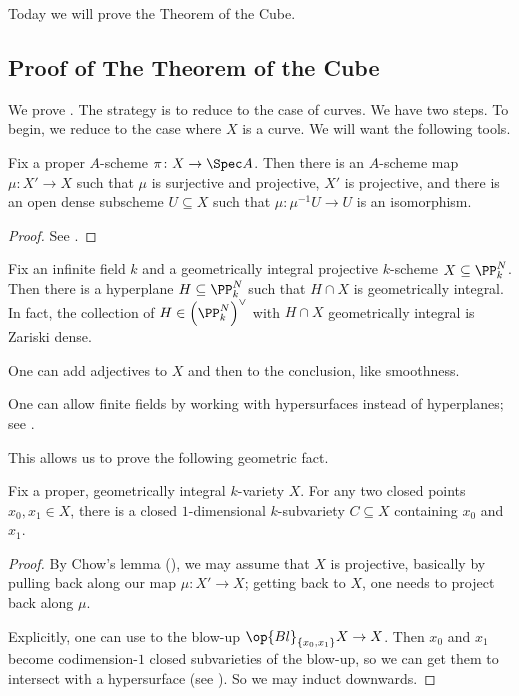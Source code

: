 \documentclass[../notes.tex]{subfiles}
\begin{document}
Today we will prove the Theorem of the Cube.

\subsection{Proof of The Theorem of the Cube}
We prove . The strategy is to reduce to the case of curves.
\cubethm*
\noindent We have two steps. To begin, we reduce to the case where $X$ is a curve. We will want the following tools.
\begin{theorem} \label{thm:chow}
	Fix a proper $A$-scheme $\pi\colon X\to\Spec A$. Then there is an $A$-scheme map $\mu\colon X'\to X$ such that $\mu$ is surjective and projective, $X'$ is projective, and there is an open dense subscheme $U\subseteq X$ such that $\mu\colon\mu^{-1}U\to U$ is an isomorphism.
\end{theorem}
\begin{proof}
	See \cite[Vakil~19.9.2]{rising-sea}.
\end{proof}
\begin{theorem}[Bertini] \label{thm:bertini}
	Fix an infinite field $k$ and a geometrically integral projective $k$-scheme $X\subseteq\PP^N_k$. Then there is a hyperplane $H\subseteq\PP^N_k$ such that $H\cap X$ is geometrically integral. In fact, the collection of $H\in\left(\PP^N_k\right)^\lor$ with $H\cap X$ geometrically integral is Zariski dense.
\end{theorem}
\begin{remark}
	One can add adjectives to $X$ and then to the conclusion, like smoothness.
\end{remark}
\begin{remark} \label{rem:finite-field-bertini}
	One can allow finite fields by working with hypersurfaces instead of hyperplanes; see \cite{charles-poonen-2017}.
\end{remark}
This allows us to prove the following geometric fact.
\begin{lemma}
	Fix a proper, geometrically integral $k$-variety $X$. For any two closed points $x_0,x_1\in X$, there is a closed $1$-dimensional $k$-subvariety $C\subseteq X$ containing $x_0$ and $x_1$.
\end{lemma}
\begin{proof}
	By Chow's lemma (), we may assume that $X$ is projective, basically by pulling back along our map $\mu\colon X'\to X$; getting back to $X$, one needs to project back along $\mu$.

	Explicitly, one can use  to the blow-up $\op{Bl}_{\{x_0,x_1\}}X\to X$. Then $x_0$ and $x_1$ become codimen\-sion-$1$ closed subvarieties of the blow-up, so we can get them to intersect with a hypersurface (see ). So we may induct downwards.\todo{}
\end{proof}
\end{document}
